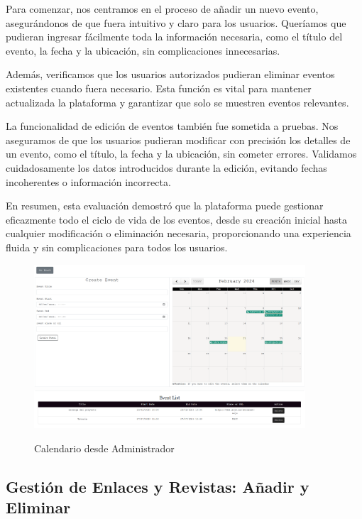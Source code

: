 \documentclass[a4paper, 12pt]{book}
\begin{document}
Para comenzar, nos centramos en el proceso de añadir un nuevo evento, asegurándonos de que fuera intuitivo y claro para los usuarios. Queríamos que pudieran 
ingresar fácilmente toda la información necesaria, como el título del evento, la fecha y la ubicación, sin complicaciones innecesarias.

Además, verificamos que los usuarios autorizados pudieran eliminar eventos existentes cuando fuera necesario. Esta función es vital para mantener actualizada 
la plataforma y garantizar que solo se muestren eventos relevantes.

La funcionalidad de edición de eventos también fue sometida a pruebas. Nos aseguramos de que los usuarios pudieran modificar con precisión los detalles de 
un evento, como el título, la fecha y la ubicación, sin cometer errores. Validamos cuidadosamente los datos introducidos durante la edición, evitando fechas 
incoherentes o información incorrecta.

En resumen, esta evaluación demostró que la plataforma puede gestionar eficazmente todo el ciclo de vida de los eventos, desde su creación inicial hasta 
cualquier modificación o eliminación necesaria, proporcionando una experiencia fluida y sin complicaciones para todos los usuarios.

\begin{figure}
  \centering
  \includegraphics[width=0.9\textwidth]{img/calendarioadmin.png}
  \includegraphics[width=0.9\textwidth]{img/calendarioadmin2.png}
  \caption{Calendario desde Administrador}
  \label{fig:calendarioadmin}
\end{figure}

\subsection{Gestión de Enlaces y Revistas: Añadir y Eliminar}
\label{sec:add-delete-links-magazines}
\end{document}
